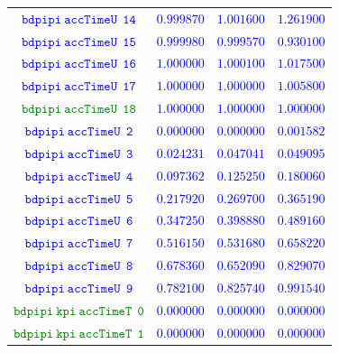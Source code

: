 \documentclass[10pt,a4paper]{article}
\begin{document}
\begin{table}[h!]
{\begin{tabular}{cccc}
\textcolor{blue}{$\mathtt{bdpipi~accTimeU~~14}$} & \textcolor{blue}{$0.999870$}& \textcolor{blue}{$1.001600$}& \textcolor{blue}{$1.261900$}\\
\textcolor{blue}{$\mathtt{bdpipi~accTimeU~~15}$} & \textcolor{blue}{$0.999980$}& \textcolor{blue}{$0.999570$}& \textcolor{blue}{$0.930100$}\\
\textcolor{blue}{$\mathtt{bdpipi~accTimeU~~16}$} & \textcolor{blue}{$1.000000$}& \textcolor{blue}{$1.000100$}& \textcolor{blue}{$1.017500$}\\
\textcolor{blue}{$\mathtt{bdpipi~accTimeU~~17}$} & \textcolor{blue}{$1.000000$}& \textcolor{blue}{$1.000000$}& \textcolor{blue}{$1.005800$}\\
\textcolor{Green}{$\mathtt{bdpipi~accTimeU~~18}$} & \textcolor{blue}{$1.000000$}& \textcolor{blue}{$1.000000$}& \textcolor{blue}{$1.000000$}\\
\textcolor{blue}{$\mathtt{bdpipi~accTimeU~~2}$} & \textcolor{blue}{$0.000000$}& \textcolor{blue}{$0.000000$}& \textcolor{blue}{$0.001582$}\\
\textcolor{blue}{$\mathtt{bdpipi~accTimeU~~3}$} & \textcolor{blue}{$0.024231$}& \textcolor{blue}{$0.047041$}& \textcolor{blue}{$0.049095$}\\
\textcolor{blue}{$\mathtt{bdpipi~accTimeU~~4}$} & \textcolor{blue}{$0.097362$}& \textcolor{blue}{$0.125250$}& \textcolor{blue}{$0.180060$}\\
\textcolor{blue}{$\mathtt{bdpipi~accTimeU~~5}$} & \textcolor{blue}{$0.217920$}& \textcolor{blue}{$0.269700$}& \textcolor{blue}{$0.365190$}\\
\textcolor{blue}{$\mathtt{bdpipi~accTimeU~~6}$} & \textcolor{blue}{$0.347250$}& \textcolor{blue}{$0.398880$}& \textcolor{blue}{$0.489160$}\\
\textcolor{blue}{$\mathtt{bdpipi~accTimeU~~7}$} & \textcolor{blue}{$0.516150$}& \textcolor{blue}{$0.531680$}& \textcolor{blue}{$0.658220$}\\
\textcolor{blue}{$\mathtt{bdpipi~accTimeU~~8}$} & \textcolor{blue}{$0.678360$}& \textcolor{blue}{$0.652090$}& \textcolor{blue}{$0.829070$}\\
\textcolor{blue}{$\mathtt{bdpipi~accTimeU~~9}$} & \textcolor{blue}{$0.782100$}& \textcolor{blue}{$0.825740$}& \textcolor{blue}{$0.991540$}\\
\textcolor{Green}{$\mathtt{bdpipi~kpi~accTimeT~~0}$} & \textcolor{blue}{$0.000000$}& \textcolor{blue}{$0.000000$}& \textcolor{blue}{$0.000000$}\\
\textcolor{Green}{$\mathtt{bdpipi~kpi~accTimeT~~1}$} & \textcolor{blue}{$0.000000$}& \textcolor{blue}{$0.000000$}& \textcolor{blue}{$0.000000$}\\

\end{tabular}}
\end{table}
\end{document}
